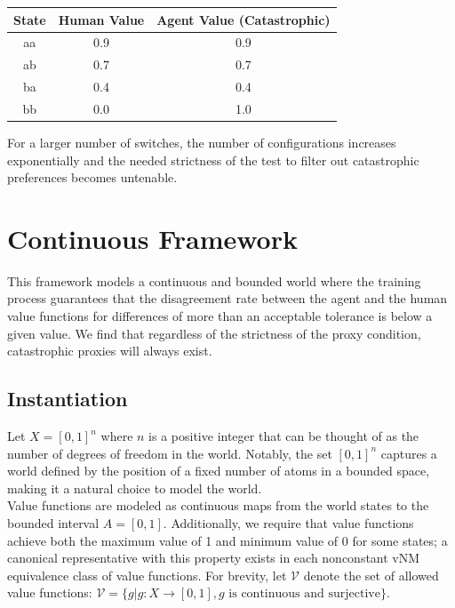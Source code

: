 \documentclass{article}
\begin{document}
\begin{center}
\begin{tabular}{||c | c | c||}
    \hline
    State & Human Value & Agent Value (Catastrophic) \\
    \hline
     aa & 0.9 & 0.9 \\
     \hline
     ab & 0.7 & 0.7 \\
     \hline
     ba & 0.4 & 0.4 \\
     \hline
     bb & 0.0 & 1.0 \\
     \hline
\end{tabular}
\end{center}

For a larger number of switches, the number of configurations increases exponentially and the needed strictness of the test to filter out catastrophic preferences becomes untenable.

\section{Continuous Framework} \label{sec:continuousFramework}
This framework models a continuous and bounded world where the training process guarantees that the disagreement rate between the agent and the human value functions for differences of more than an acceptable tolerance is below a given value. We find that regardless of the strictness of the proxy condition, catastrophic proxies will always exist.

\subsection{Instantiation}
Let $X = [0,1]^n$ where $n$ is a positive integer that can be thought of as the number of degrees of freedom in the world. Notably, the set $[0,1]^n$ captures a world defined by the position of a fixed number of atoms in a bounded space, making it a natural choice to model the world.\\

Value functions are modeled as continuous maps from the world states to the bounded interval $A = [0,1]$. Additionally, we require that value functions achieve both the maximum value of 1 and minimum value of 0 for some states; a canonical representative with this property exists in each nonconstant vNM equivalence class of value functions. For brevity, let $\mathcal V$ denote the set of allowed value functions: $\mathcal V = \{g | g : X \rightarrow[0,1], g \text{ is continuous and surjective} \}.$\\
\end{document}
